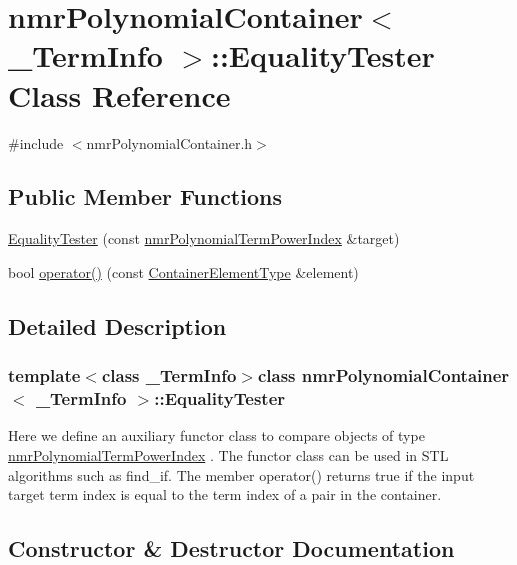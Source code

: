 \hypertarget{classnmr_polynomial_container_1_1_equality_tester}{}\section{nmr\+Polynomial\+Container$<$ \+\_\+\+Term\+Info $>$\+:\+:Equality\+Tester Class Reference}
\label{classnmr_polynomial_container_1_1_equality_tester}


{\ttfamily \#include $<$nmr\+Polynomial\+Container.\+h$>$}

\subsection*{Public Member Functions}
\begin{DoxyCompactItemize}
\item 
\hyperlink{classnmr_polynomial_container_1_1_equality_tester_a6f0233ad0d5f5e2fde0c69ed369ff42a}{Equality\+Tester} (const \hyperlink{classnmr_polynomial_term_power_index}{nmr\+Polynomial\+Term\+Power\+Index} \&target)
\item 
bool \hyperlink{classnmr_polynomial_container_1_1_equality_tester_a97c80879184f550aff13be8b76734748}{operator()} (const \hyperlink{classnmr_polynomial_container_ae9c399b9034fb32315a644ebb103b4dd}{Container\+Element\+Type} \&element)
\end{DoxyCompactItemize}


\subsection{Detailed Description}
\subsubsection*{template$<$class \+\_\+\+Term\+Info$>$class nmr\+Polynomial\+Container$<$ \+\_\+\+Term\+Info $>$\+::\+Equality\+Tester}

Here we define an auxiliary functor class to compare objects of type \hyperlink{classnmr_polynomial_term_power_index}{nmr\+Polynomial\+Term\+Power\+Index} . The functor class can be used in S\+T\+L algorithms such as find\+\_\+if. The member operator() returns true if the input target term index is equal to the term index of a pair in the container. 

\subsection{Constructor \& Destructor Documentation}
\hypertarget{classnmr_polynomial_container_1_1_equality_tester_a6f0233ad0d5f5e2fde0c69ed369ff42a}{}
